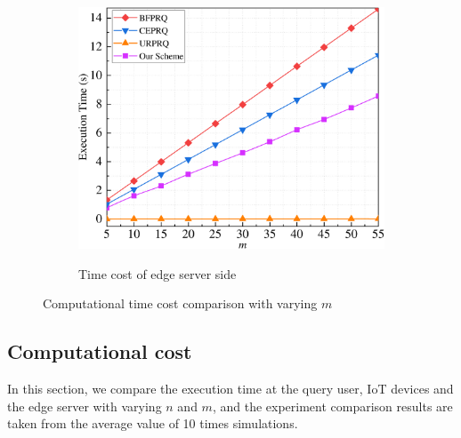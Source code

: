 \documentclass[IEEE JOURNAL OF BIOMEDICAL AND HEALTH INFORMATICS]{IEEEtran}
\begin{document}
\begin{figure}
\begin{subfigure}[t]{0.3\textwidth}
		\centering
		\includegraphics[width=1\textwidth]{com_3m}\\
		\caption{Time cost of edge server side}\label{com_3m}
	\end{subfigure}
	\caption{Computational time cost comparison with varying $m$}\label{computation_m}
\end{figure}



\subsection{Computational cost}
In this section, we compare the execution time at the query user, IoT devices and the edge server with varying $n$ and $m$, and the experiment comparison results are taken from the average value of 10 times simulations.
\end{document}
